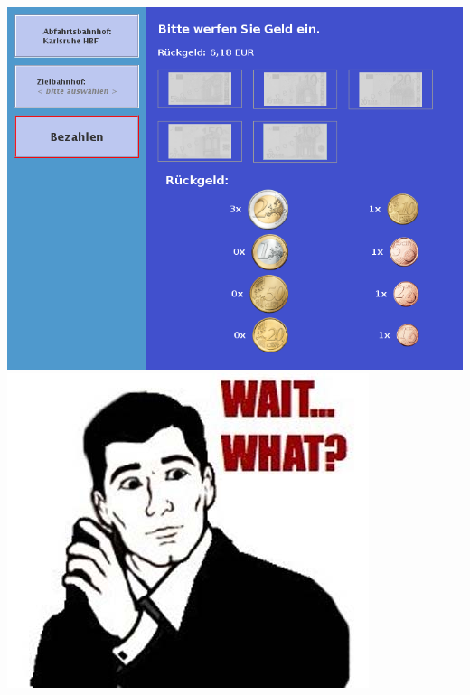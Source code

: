 \documentclass[final]{beamer}
\begin{document}
\begin{frame}
	\begin{columns}[T]
			\includegraphics[width=\textwidth]{gfx/bahnticketautomat_rueckgeld}
		\pause
			\includegraphics[width=\textwidth]{gfx/Wait-what-meme-rage-face.jpg}
	\end{columns}
\end{frame}
\end{document}
